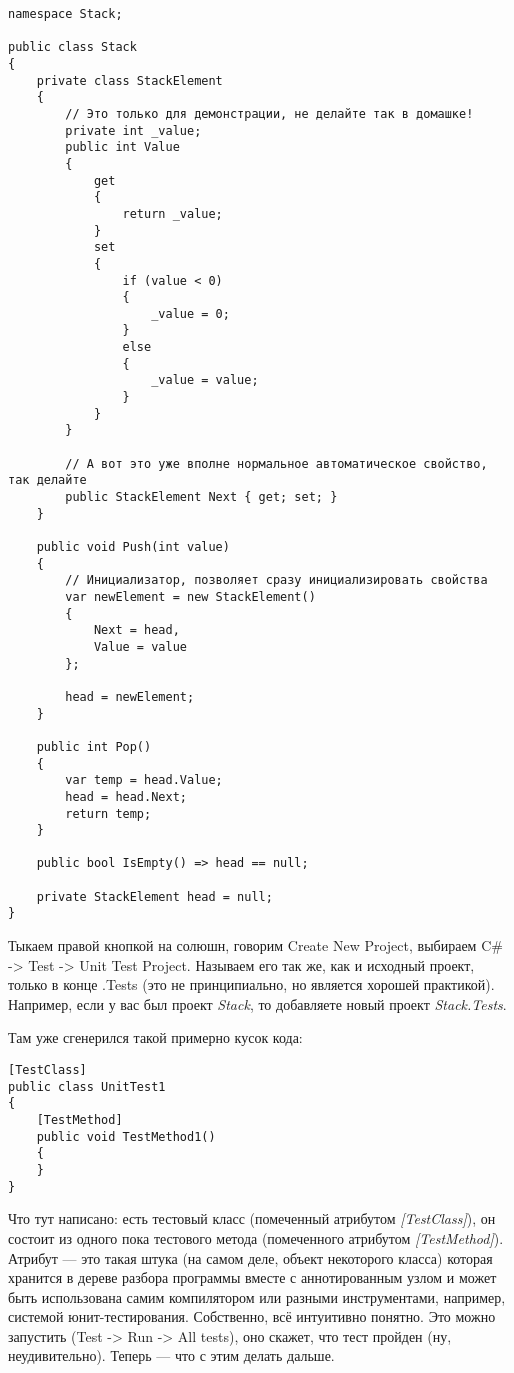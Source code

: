 \documentclass{../../text-style}
\begin{document}
\begin{verbatim}
namespace Stack;

public class Stack
{
    private class StackElement
    {
        // Это только для демонстрации, не делайте так в домашке!
        private int _value;
        public int Value
        {
            get
            {
                return _value;
            }
            set
            {
                if (value < 0)
                {
                    _value = 0;
                }
                else
                {
                    _value = value;
                }
            }
        }

        // А вот это уже вполне нормальное автоматическое свойство, так делайте
        public StackElement Next { get; set; }
    }

    public void Push(int value)
    {
        // Инициализатор, позволяет сразу инициализировать свойства
        var newElement = new StackElement()
        {
            Next = head,
            Value = value
        };

        head = newElement;
    }

    public int Pop()
    {
        var temp = head.Value;
        head = head.Next;
        return temp;
    }

    public bool IsEmpty() => head == null;

    private StackElement head = null;
}
\end{verbatim}

Тыкаем правой кнопкой на солюшн, говорим Create New Project, выбираем C\# -> Test -> Unit Test Project. Называем его так же, как и исходный проект, только в конце .Tests (это не принципиально, но является хорошей практикой). Например, если у вас был проект \textit{Stack}, то добавляете новый проект \textit{Stack.Tests}. 

Там уже сгенерился такой примерно кусок кода:

\begin{verbatim}
[TestClass]
public class UnitTest1
{
    [TestMethod]
    public void TestMethod1()
    {
    }
}
\end{verbatim}

Что тут написано: есть тестовый класс (помеченный атрибутом \textit{[TestClass]}), он состоит из одного пока тестового метода (помеченного атрибутом \textit{[TestMethod]}). Атрибут --- это такая штука (на самом деле, объект некоторого класса) которая хранится в дереве разбора программы вместе с аннотированным узлом и может быть использована самим компилятором или разными инструментами, например, системой юнит-тестирования. Собственно, всё интуитивно понятно. Это можно запустить (Test -> Run -> All tests), оно скажет, что тест пройден (ну, неудивительно). Теперь --- что с этим делать дальше.
\end{document}

